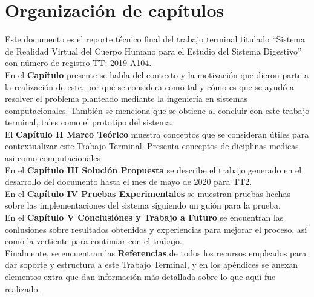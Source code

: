 \section{Organización de capítulos}
Este documento es el reporte técnico final del trabajo terminal titulado “Sistema de Realidad Virtual del Cuerpo Humano para el Estudio del Sistema Digestivo” con número de registro TT: 2019-A104.\\
En el \textbf{Capítulo} presente se habla del contexto y la motivación que dieron parte a la realización  de este, por qué se considera como tal y cómo es que se ayudó a resolver el problema planteado mediante la ingeniería en sistemas computacionales. También se menciona que se obtiene al concluir con este trabajo terminal, tales como el prototipo del sistema.\\
El \textbf{Capítulo II Marco Teórico} muestra conceptos que se consideran útiles para contextualizar este Trabajo Terminal. Presenta conceptos de diciplinas medicas asi como computacionales\\
En el \textbf{Capítulo III Soluci\'on Propuesta} se describe el trabajo generado en el desarrollo del documento hasta el mes de mayo de 2020 para TT2.\\
En el \textbf{Capítulo IV Pruebas Experimentales} se muestran pruebas hechas sobre las implementaciones del sistema siguiendo un guión para la prueba.\\ 
En el \textbf{Capítulo V Conclusiónes y Trabajo a Futuro} se encuentran las conlusiones sobre resultados obtenidos y experiencias para mejorar el proceso, así como la vertiente para continuar con el trabajo.\\
Finalmente, se encuentran las \textbf{Referencias} de todos los recursos empleados para dar soporte y estructura a este Trabajo Terminal, y en los apéndices se anexan elementos extra que dan información más detallada sobre lo que aquí fue realizado.\\
